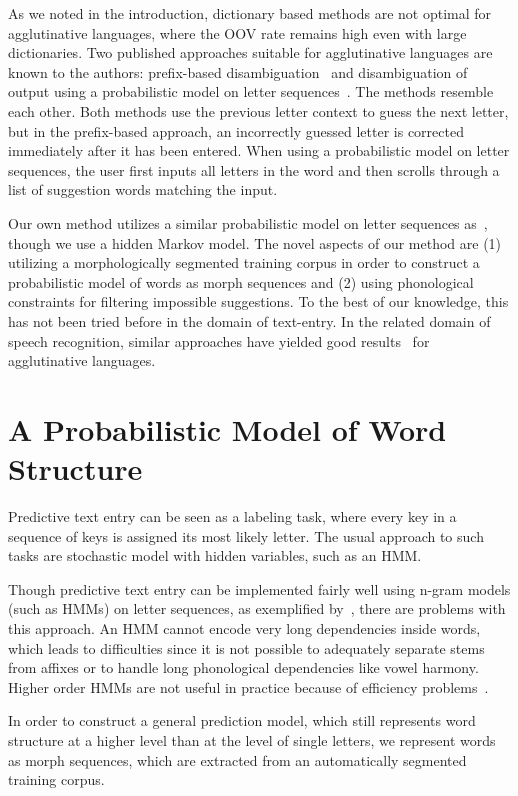 \documentclass{llncs}
\begin{document}
As we noted in the introduction, dictionary based methods are not
optimal for agglutinative languages, where the OOV rate remains high
even with large dictionaries. Two published approaches suitable for
agglutinative languages are known to the authors: prefix-based
disambiguation~\cite{Mackenzie01letterwise:prefix-based} and
disambiguation of output using a probabilistic model on letter
sequences~\cite{Tantug:2010}. The methods resemble each other. Both
methods use the previous letter context to guess the next letter, but
in the prefix-based approach, an incorrectly guessed letter is
corrected immediately after it has been entered. When using a
probabilistic model on letter sequences, the user first inputs all
letters in the word and then scrolls through a list of suggestion
words matching the input.

Our own method utilizes a similar probabilistic model on letter
sequences as~\cite{Tantug:2010}, though we use a hidden Markov
model. The novel aspects of our method are (1) utilizing a
morphologically segmented training corpus in order to construct a
probabilistic model of words as morph sequences and (2) using
phonological constraints for filtering impossible suggestions. To the
best of our knowledge, this has not been tried before in the domain of
text-entry. In the related domain of speech recognition, similar
approaches have yielded good results~\cite{Creutz_morph-basedspeech}
for agglutinative languages.

\section{A Probabilistic Model of Word Structure}\label{model}

Predictive text entry can be seen as a labeling task, where every key
in a sequence of keys is assigned its most likely letter. The usual
approach to such tasks are stochastic model with hidden variables,
such as an HMM.

Though predictive text entry can be implemented fairly well using
n-gram models (such as HMMs) on letter sequences, as exemplified
by~\cite{Tantug:2010}, there are problems with this approach. An HMM
cannot encode very long dependencies inside words, which leads to
difficulties since it is not possible to adequately separate stems
from affixes or to handle long phonological dependencies like vowel
harmony. Higher order HMMs are not useful in practice because of
efficiency problems~\cite{Tantug:2010}.

In order to construct a general prediction model, which still
represents word structure at a higher level than at the level of
single letters, we represent words as morph sequences, which are
extracted from an automatically segmented training corpus.
\end{document}
